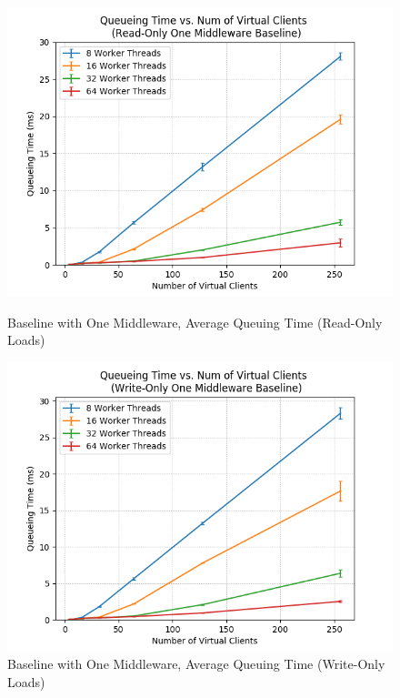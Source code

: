 \documentclass[11pt,a4paper]{article}
\begin{document}
\begin{figure}[H]
	\captionsetup{font=scriptsize,labelfont=scriptsize,justification=centering}
	\centering
	\begin{minipage}{0.5\textwidth}
		\centering
		\includegraphics[scale=0.525]{images/3a_one-mw_r-o_wt.png}
		\caption{{Baseline with One Middleware, Average Queuing Time (Read-Only Loads)}}
	\end{minipage}\hfill
	\begin{minipage}{0.5\textwidth}
		\centering
		\includegraphics[scale=0.525]{images/3a_one-mw_w-o_wt.png}
		\caption{{Baseline with One Middleware, Average Queuing Time (Write-Only Loads)}}
	\end{minipage}
\end{figure}
\end{document}
